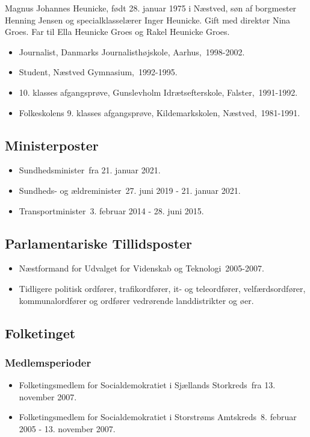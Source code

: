 \documentclass[11pt, a4paper]{awesome-cv}
\begin{document}
\makecvheader[R]
\makelettertitle
\begin{cvletter}
Magnus Johannes Heunicke, født 28. januar 1975 i Næstved, søn af borgmester Henning Jensen og specialklasselærer Inger Heunicke. Gift med direktør Nina Groes. Far til Ella Heunicke Groes og Rakel Heunicke Groes.

\begin{itemize}
\item Journalist, Danmarks Journalisthøjskole, Aarhus, 1998-2002.
\item Student, Næstved Gymnasium, 1992-1995.
\item 10. klasses afgangsprøve, Gunslevholm Idrætsefterskole, Falster, 1991-1992.
\item Folkeskolens 9. klasses afgangsprøve, Kildemarkskolen, Næstved, 1981-1991.
\end{itemize}
\subsection*{Ministerposter}
\begin{itemize}
\item Sundhedsminister fra 21. januar 2021.
\item Sundheds- og ældreminister 27. juni 2019 - 21. januar 2021.
\item Transportminister 3. februar 2014 - 28. juni 2015.
\end{itemize}
\subsection*{Parlamentariske Tillidsposter}
\begin{itemize}
\item Næstformand for Udvalget for Videnskab og Teknologi 2005-2007.
\item Tidligere politisk ordfører, trafikordfører, it- og teleordfører, velfærdsordfører, kommunalordfører og ordfører vedrørende landdistrikter og øer.
\end{itemize}
\subsection*{Folketinget}
\subsubsection*{Medlemsperioder}
\begin{itemize}
\item Folketingsmedlem for Socialdemokratiet i Sjællands Storkreds fra 13. november 2007.
\item Folketingsmedlem for Socialdemokratiet i Storstrøms Amtskreds 8. februar 2005 - 13. november 2007.
\end{itemize}

\end{cvletter}
\end{document}
